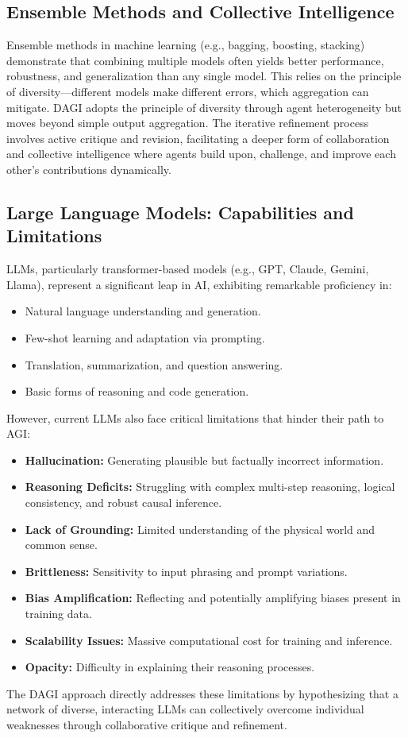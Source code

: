 \documentclass[12pt]{amsart}
\begin{document}
\subsection{Ensemble Methods and Collective Intelligence}
Ensemble methods in machine learning (e.g., bagging, boosting, stacking) demonstrate that combining multiple models often yields better performance, robustness, and generalization than any single model. This relies on the principle of diversity—different models make different errors, which aggregation can mitigate. DAGI adopts the principle of diversity through agent heterogeneity but moves beyond simple output aggregation. The iterative refinement process involves active critique and revision, facilitating a deeper form of collaboration and collective intelligence where agents build upon, challenge, and improve each other's contributions dynamically.

\subsection{Large Language Models: Capabilities and Limitations}
\label{subsec:llm_limitations}
LLMs, particularly transformer-based models (e.g., GPT, Claude, Gemini, Llama), represent a significant leap in AI, exhibiting remarkable proficiency in:
\begin{itemize}[leftmargin=*]
    \item Natural language understanding and generation.
    \item Few-shot learning and adaptation via prompting.
    \item Translation, summarization, and question answering.
    \item Basic forms of reasoning and code generation.
\end{itemize}
However, current LLMs also face critical limitations that hinder their path to AGI:
\begin{itemize}[leftmargin=*]
    \item \textbf{Hallucination:} Generating plausible but factually incorrect information.
    \item \textbf{Reasoning Deficits:} Struggling with complex multi-step reasoning, logical consistency, and robust causal inference.
    \item \textbf{Lack of Grounding:} Limited understanding of the physical world and common sense.
    \item \textbf{Brittleness:} Sensitivity to input phrasing and prompt variations.
    \item \textbf{Bias Amplification:} Reflecting and potentially amplifying biases present in training data.
    \item \textbf{Scalability Issues:} Massive computational cost for training and inference.
    \item \textbf{Opacity:} Difficulty in explaining their reasoning processes.
\end{itemize}
The DAGI approach directly addresses these limitations by hypothesizing that a network of diverse, interacting LLMs can collectively overcome individual weaknesses through collaborative critique and refinement.
\end{document}
